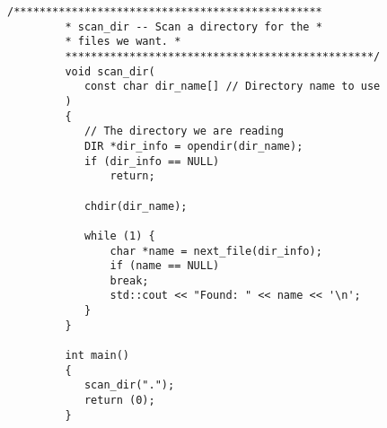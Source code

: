 \begin{LTR}
\begin{lstlisting}[style=C++Style]
         /************************************************
         * scan_dir -- Scan a directory for the *
         * files we want. *
         ************************************************/
         void scan_dir(
         	const char dir_name[] // Directory name to use
         )
         {
         	// The directory we are reading
         	DIR *dir_info = opendir(dir_name);
         	if (dir_info == NULL)
         		return;

         	chdir(dir_name);

         	while (1) {
         		char *name = next_file(dir_info);
         		if (name == NULL)
         		break;
         		std::cout << "Found: " << name << '\n';
         	}
         }

         int main()
         {
         	scan_dir(".");
         	return (0);
         }
    \end{lstlisting}
\end{LTR}